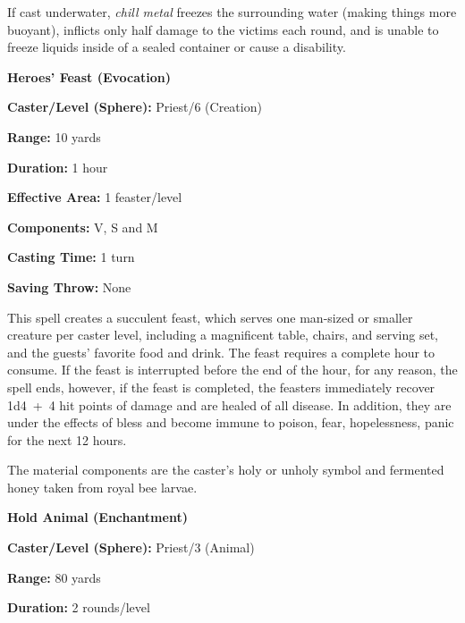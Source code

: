 \begin{multicols}{2}
If cast underwater, \textit{chill metal} freezes the surrounding water (making things more buoyant), inflicts only half damage to the victims each round, and is unable to freeze liquids inside of a sealed container or cause a disability.

\vspace{1em}

\noindent
\begin{minipage}{\columnwidth}

\noindent \textbf{Heroes' Feast (Evocation)}

\noindent \textbf{Caster/Level (Sphere):} Priest/6 (Creation)

\noindent \textbf{Range:} 10 yards

\noindent \textbf{Duration:} 1 hour

\noindent \textbf{Effective Area:} 1 feaster/level

\noindent \textbf{Components:} V, S and M

\noindent \textbf{Casting Time:} 1 turn

\noindent \textbf{Saving Throw:} None

\end{minipage}

This spell creates a succulent feast, which serves one man-sized or smaller creature per caster level, including a magnificent table, chairs, and serving set, and the guests' favorite food and drink.  The feast requires a complete hour to consume.  If the feast is interrupted before the end of the hour, for any reason, the spell ends, however, if the feast is completed, the feasters immediately recover 1d4~+~4 hit points of damage and are healed of all disease.  In addition, they are under the effects of bless and become immune to poison, fear, hopelessness, panic for the next 12 hours.

The material components are the caster's holy or unholy symbol and fermented honey taken from royal bee larvae.

\vspace{1em}

\noindent
\begin{minipage}{\columnwidth}

\noindent \textbf{Hold Animal (Enchantment)}

\noindent \textbf{Caster/Level (Sphere):} Priest/3 (Animal)

\noindent \textbf{Range:} 80 yards

\noindent \textbf{Duration:} 2 rounds/level


\end{minipage}
\end{multicols}
